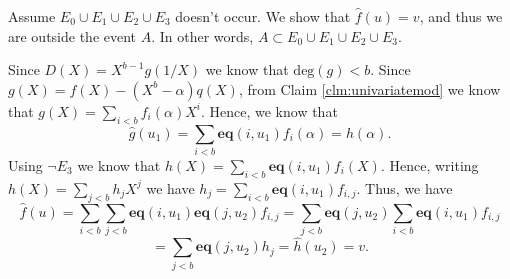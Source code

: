\documentclass[11pt]{article} %
\renewcommand{\deg}{\ensuremath{\mathrm{deg}}\xspace}
\newcommand{\sumi}[1]{\sum_{i< #1}}
\newcommand{\sumj}[1]{\sum_{j< #1}}
\newcommand{\eq}{\ensuremath{\mathsf{eq}}\xspace}
\renewcommand{\eq}{\ensuremath{\mathbf{eq}}\xspace}
\newcommand{\mle}[1]{\ensuremath{\hat{#1}}\xspace}
\begin{document}
Assume  $E_0\cup E_1 \cup E_2\cup E_3$ doesn't occur. We show that $\mle{f}(u)=v$, and thus we are outside the event $A$.
In other words, $A\subset E_0\cup E_1 \cup E_2 \cup E_3$.


Since
$ D(X) = X^{b-1} g(1/X)$ we know that $\deg(g)<b$.
Since  $g(X) =  f(X)-(X^b-\alpha)q(X)$, from Claim \ref{clm:univariatemod} we know that
$g(X)=\sumi{b}f_i(\alpha)X^i$.
Hence, we know that 
\[\mle{g}(u_1) = \sumi{b}\eq(i,u_1) f_i(\alpha) = h(\alpha).\]
Using $\neg E_3$ we  know that
$h(X)=\sumi{b}\eq(i,u_1) f_i(X)$.
Hence, writing $h(X)=\sumj{b}h_j X^j$ we have 
$h_j= \sumi{b}\eq(i,u_1) f_{i,j}$.
Thus, we have
\[\mle{f}(u) = \sumi{b}\sumj{b}\eq(i,u_1)\eq(j,u_2) f_{i,j} = \sumj{b}\eq(j,u_2) \sumi{b}\eq(i,u_1) f_{i,j} \]
\[=\sumj{b} \eq(j,u_2) h_j = \mle{h}(u_2) = v.\]




\end{document}
